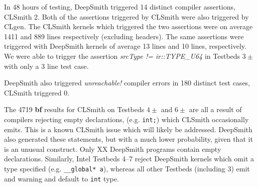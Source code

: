 In 48 hours of testing, DeepSmith triggered 14 distinct compiler assertions, CLSmith 2. Both of the assertions triggered by CLSmith were also triggered by CLgen.
%
%
%
The CLSmith kernels which triggered the two assertions were on average 1411 and 889 lines respectively (excluding headers). The same assertions were triggered with DeepSmith kernels of average 13 lines and 10 lines, respectively. 
%
We were able to trigger the assertion \emph{srcType != ir::TYPE\_U64} in Testbeds $3\pm$ with only a 3 line test case.

DeepSmith also triggered \emph{unreachable!} compiler errors in 180 distinct test cases, CLSmith triggered 0.

The 4719 \textbf{bf} results for CLSmith on Testbeds $4\pm$ and $6\pm$ are all a result of compilers rejecting empty declarations, (e.g. \texttt{int;}) which CLSmith occasionally emits. This is a known CLSmith issue which will likely be addressed. DeepSmith also generated these statements, but with a much lower probability, given that it is an unusual construct. Only XX DeepSmith programs  contain empty declarations.
Similarly, Intel Testbeds 4--7 reject DeepSmith kernels which omit a type specified (e.g. \texttt{\_\_global* a}), whereas all other Testbeds (including 3) emit and warning and default to \texttt{int} type.

